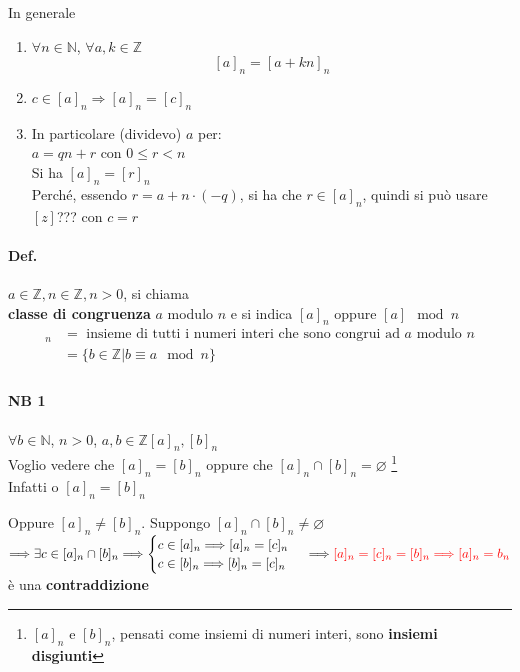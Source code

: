 In generale 
\begin{enumerate}
    \item $\forall n\in\mathbb{N}$, $\forall a, k \in\mathbb{Z}$
        $$[a]_n=[a+kn]_n$$
    \item $c\in [a]_n\Longrightarrow [a]_n=[c]_n$
    \item In particolare (dividevo) $a$ per:\\
        $a=qn+r$ con $0\leq r< n$\\
        Si ha $[a]_n=[r]_n$\\
        Perché, essendo $r=a+n\cdot(-q)$, si ha che $r\in[a]_n$, quindi si può 
        usare $[z]$??? con $c=r$
\end{enumerate}
\paragraph{Def.} $a\in\mathbb{Z}, n\in\mathbb{Z}, n>0$, si chiama
\\{\color{red} 
\textbf{classe di congruenza} $a$ modulo $n$} e si indica $[a]_n$ oppure $[a]\mod n$\\
\begin{align*}
    [a]_n & = \textrm{ insieme di tutti i numeri interi che sono congrui ad }a \textrm{ modulo }n\\
    & =\{b\in\mathbb{Z}|b\equiv a\mod n\}\\
\end{align*}
\paragraph{NB 1} $\forall b\in\mathbb{N}$, $n>0$, $a,b\in\mathbb{Z}$\hspace{1cm}$[a]_n,[b]_n$\\
Voglio vedere che $[a]_n=[b]_n$ oppure che $[a]_n \cap [b]_n=\varnothing$ \footnote{
    $[a]_n$ e $[b]_n$, pensati come insiemi di numeri interi, sono \textbf{insiemi disgiunti}}
\color{blue}\\
Infatti o $[a]_n=[b]_n$

Oppure $[a]_n\neq[b]_n$. Suppongo $[a]_n\cap[b]_n\neq\varnothing$\\
$\Longrightarrow \exists c \in[a]_n\cap[b]_n \Longrightarrow
\begin{cases}
    c\in[a]_n\Longrightarrow [a]_n=[c]_n\\
    c\in[b]_n\Longrightarrow [b]_n=[c]_n\\
\end{cases}\\
\Longrightarrow \color{red}
[a]_n=[c]_n=[b]_n\Longrightarrow[a]_n=b_n$
è una \textbf {contraddizione}
\color{black}
